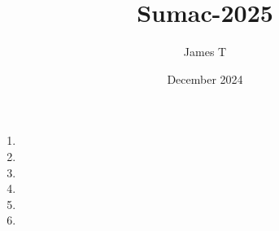 \documentclass{article}
\title{Sumac-2025}
\author{James T}
\date{December 2024}
\newif\ifsolutions\solutionstrue
\begin{document}
\maketitle

\begin{enumerate}


\item 
\ifsolutions
  
\fi

\item 
\ifsolutions
  
\fi

\item 
\ifsolutions
  
\fi

\item 
\ifsolutions
  
\fi

\item 
\ifsolutions
  
\fi

\item 
\ifsolutions
  
\fi

\end{enumerate}
\end{document}

